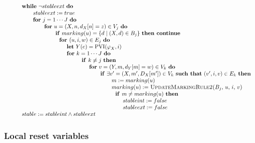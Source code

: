\begin{equation*}
\begin{array}{l}
\begin{tabular}{l}
$\qquad $\textbf{while} $\lnot stableext$ \textbf{do} \\ 
$\qquad \qquad stableext:=true$ \\ 
$\qquad \qquad $\textbf{for} $j=1\cdots J$ \textbf{do} \\ 
$\qquad \qquad \qquad $\textbf{for} $u=(X,n,d_{X}[n]=z)\in V_{j}$ \textbf{do}
\\ 
$\qquad \qquad \qquad \qquad $\textbf{if} $marking(u)=\{d\mid (X,d)\in
B_{j}\}$ \textbf{then continue} \\ 
$\qquad \qquad \qquad \qquad \text{\textbf{for }}(u,i,w)\in E_{j}$ \textbf{do%
} \\ 
$\qquad \qquad \qquad \qquad \qquad $\textbf{let} $Y(e)=\mathrm{PVI}(\varphi
_{X},i)$ \\ 
$\qquad \qquad \qquad \qquad \qquad $\textbf{for} $k=1\cdots J$ \textbf{do}
\\ 
$\qquad \qquad \qquad \qquad \qquad \qquad \text{\textbf{if }}k\neq j$ 
\textbf{then} \\ 
$\qquad \qquad \qquad \qquad \qquad \qquad \qquad $\textbf{for} $%
v=(Y,m,d_{Y}[m]=w)\in V_{k}$ \textbf{do} \\ 
$\qquad \qquad \qquad \qquad \qquad \qquad \qquad \qquad $\textbf{if} $%
\exists v^{\prime }=(X,m^{\prime },D_{X}[m^{\prime }])\in V_{k}$ \textbf{%
such that} $(v^{\prime },i,v)\in E_{k}$ \textbf{then} \\ 
$\qquad \qquad \qquad \qquad \qquad \qquad \qquad \qquad \qquad
m:=marking(u) $ \\ 
$\qquad \qquad \qquad \qquad \qquad \qquad \qquad \qquad \qquad marking(u):=$
\textsc{UpdateMarkingRule2(}$B_{j}$, $u$, $i$, $v$\textsc{)} \\ 
$\qquad \qquad \qquad \qquad \qquad \qquad \qquad \qquad \qquad \text{%
\textbf{if }}m\neq marking(u)$ \textbf{then} \\ 
$\qquad \qquad \qquad \qquad \qquad \qquad \qquad \qquad \qquad \qquad
stableint:=false$ \\ 
$\qquad \qquad \qquad \qquad \qquad \qquad \qquad \qquad \qquad \qquad
stableext:=false$ \\ 
$\qquad stable:=stableint\wedge stableext$%
\end{tabular}%
\end{array}%
\end{equation*}

\newpage

\subsubsection{Local reset variables}

